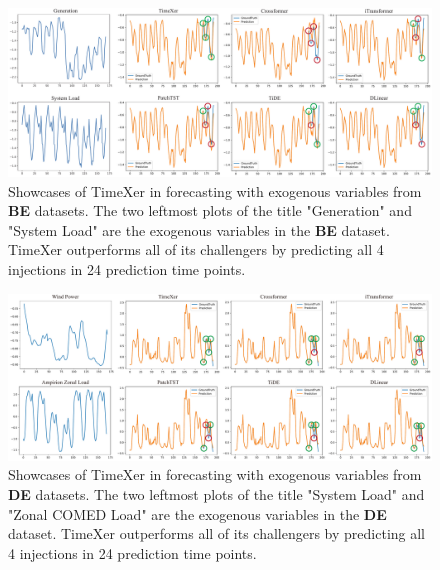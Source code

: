 \documentclass[nohyperref]{article}
\theoremstyle{plain}
\theoremstyle{definition}
\theoremstyle{remark}
\begin{document}
\begin{figure}[h]
    \centering
    \includegraphics[width=\linewidth]{fig/TimeXer_Showcase_BE_7180.pdf}
    \vspace{-20pt}
    \caption{Showcases of TimeXer in forecasting with exogenous variables from \textbf{BE} datasets. The two leftmost plots of the title "Generation" and "System Load" are the exogenous variables in the \textbf{BE} dataset. TimeXer outperforms all of its challengers by predicting all 4 injections in 24 prediction time points.}
    \label{fig:showBE}
\end{figure}

\begin{figure}[!htbp]
    \centering
    \includegraphics[width=\linewidth]{fig/TimeXer_Showcase_DE_140.pdf}
    \vspace{-20pt}
    \caption{Showcases of TimeXer in forecasting with exogenous variables from \textbf{DE} datasets. The two leftmost plots of the title "System Load" and "Zonal COMED Load" are the exogenous variables in the \textbf{DE} dataset. TimeXer outperforms all of its challengers by predicting all 4 injections in 24 prediction time points.}
    \label{fig:showDE}
\end{figure}
\end{document}
